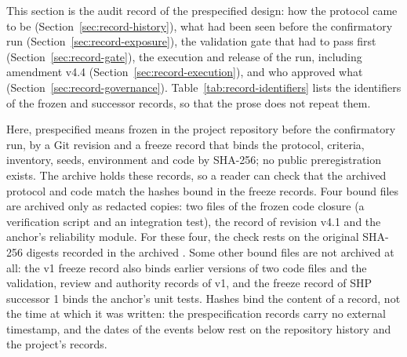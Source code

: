 
This section is the audit record of the prespecified design: how the protocol came to be (Section~\ref{sec:record-history}), what had been seen before the confirmatory run (Section~\ref{sec:record-exposure}), the validation gate that had to pass first (Section~\ref{sec:record-gate}), the execution and release of the run, including amendment v4.4 (Section~\ref{sec:record-execution}), and who approved what (Section~\ref{sec:record-governance}). Table~\ref{tab:record-identifiers} lists the identifiers of the frozen and successor records, so that the prose does not repeat them.

Here, prespecified means frozen in the project repository before the confirmatory run, by a Git revision and a freeze record that binds the protocol, criteria, inventory, seeds, environment and code by SHA-256; no public preregistration exists. The archive holds these records, so a reader can check that the archived protocol and code match the hashes bound in the freeze records. Four bound files are archived only as redacted copies: two files of the frozen code closure (a verification script and an integration test), the record of revision v4.1 and the anchor's reliability module. For these four, the check rests on the original SHA-256 digests recorded in the archived . Some other bound files are not archived at all: the v1 freeze record also binds earlier versions of two code files and the validation, review and authority records of v1, and the freeze record of SHP successor 1 binds the anchor's unit tests. Hashes bind the content of a record, not the time at which it was written: the prespecification records carry no external timestamp, and the dates of the events below rest on the repository history and the project's records.

